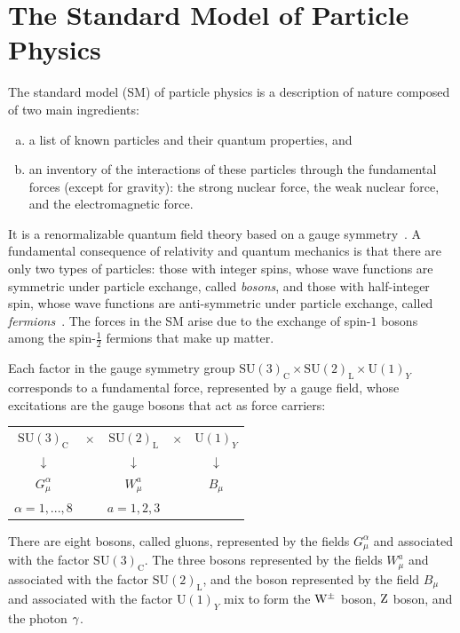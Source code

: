 \section{The Standard Model of Particle Physics}

The standard model (SM) of particle physics is a description of nature
composed of two main ingredients:
\begin{enumerate}[(a)]
\item a list of known particles and their quantum properties, and
\item an inventory of the interactions of these particles through the fundamental forces
(except for gravity): the strong nuclear force, the weak nuclear force, and the electromagnetic
force. 
\end{enumerate}
It is a renormalizable quantum field theory based on a gauge
symmetry~\cite{tHooft:419894}. A fundamental consequence of relativity and quantum mechanics
is that there are only two types of particles: those with integer
spins, whose wave functions are symmetric under particle exchange, called \emph{bosons}, and those
with half-integer spin, whose wave functions are anti-symmetric under
particle exchange, called \emph{fermions}~\cite{PhysRev.58.716}. The forces in
the SM arise due to the exchange of spin-$1$ bosons among the
spin-$\frac{1}{2}$ fermions that make up matter. 

Each factor in the gauge symmetry group $\mathrm{SU(3)}_{\mathrm{C}}\times
\mathrm{SU(2)}_{\mathrm{L}}\times\mathrm{U(1)}_Y$ corresponds to a fundamental force, represented by a gauge field, whose excitations are
the gauge bosons that act as force carriers:
\begin{center}
\begin{tabular}{ccccc}
$\mathrm{SU(3)}_{\mathrm{C}}$ &$\times$& $\mathrm{SU(2)}_{\mathrm{L}}$
  &$\times$& $\mathrm{U(1)}_Y$\\
 $\downarrow$&&$\downarrow$&&$\downarrow$\\
 $G_{\mu}^{\alpha}$&&$W^a_{\mu}$&&$B_{\mu}$\\
 $\alpha=1,...,8$&&$a=1,2,3$&&
\end{tabular}
\end{center}
There are eight bosons, called gluons, represented by the fields
$G_{\mu}^{\alpha}$ and associated with the factor
$\mathrm{SU(3)}_{\mathrm{C}}$. The three bosons represented by
the fields  $W^{a}_{\mu}$ and associated with the factor
$\mathrm{SU(2)}_{\mathrm{L}}$, and the boson represented by the field
$B_{\mu}$ and associated with the factor $\mathrm{U(1)}_Y$ mix to form the
$\mathrm{W}^{\pm}$ boson, $\mathrm{Z}$ boson, and the photon $\gamma$.

